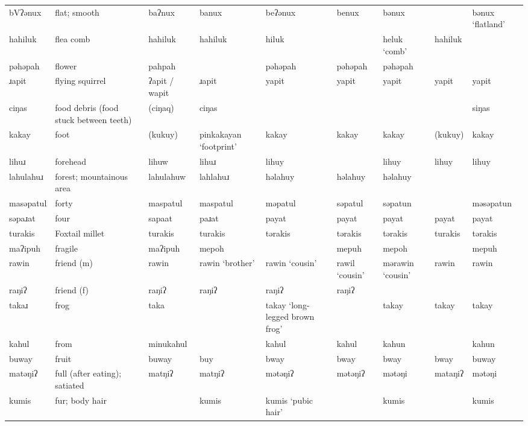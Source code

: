 \begin{landscape}
\begin{longtable}{*{9}{>{\raggedright\arraybackslash}p{}}}
\text{*}bVʔənux      & flat; smooth & baʔnux & banux & beʔənux & benux & bənux &  & bənux \newline `flatland'\\
\text{*}hahiluk      & flea comb & hahiluk & hahiluk & hiluk &  & heluk `comb' & hahiluk & \\
\text{*}pəhəpah      & flower & pahpah &  & pəhəpah & pəhəpah & pəhəpah &  & \\
\text{*}ɹapit        & flying squirrel & ʔapit / wapit & ɹapit & yapit & yapit & yapit & yapit & yapit\\
\text{*}ciŋas        & food debris (food stuck between teeth) & (ciŋaq) & ciŋas &  &  &  &  & siŋas\\
\text{*}kakay        & foot & (kukuy) & pinkakayan `footprint' & kakay & kakay & kakay & (kukuy) & kakay\\
\text{*}lihuɹ        & forehead & lihuw & lihuɹ & lihuy &  & lihuy & lihuy & lihuy\\
\text{*}lahulahuɹ    & forest; mountainous area & lahulahuw & lahlahuɹ & həlahuy & həlahuy & həlahuy &  & \\
\text{*}masəpatul    & forty & maspatul & maspatul & məpatul & səpatul & səpatun &  & məsəpatun\\
\text{*}səpaɹat      & four & sapaat & paɹat & payat & payat & payat & payat & payat\\
\text{*}turakis      & Foxtail millet & turakis & turakis & tərakis & tərakis & tərakis & turakis & tərakis\\
\text{*}maʔipuh      & fragile & maʔipuh & mepoh &  & mepuh & mepoh &  & mepuh\\
\text{*}rawin        & friend (m) & rawin & rawin `brother' & rawin `cousin' & rawil \newline `cousin' & mərawin `cousin' & rawin & rawin\\
\text{*}raŋiʔ        & friend (f) & raŋiʔ & raŋiʔ & raŋiʔ & raŋiʔ &  &  & \\
\text{*}takaɹ        & frog & taka &  & takay `long-legged brown frog' &  & takay & takay & takay\\
\text{*}kahul       & from & minukahul &  & kahul & kahul & kahun &  & kahun\\
\text{*}buway        & fruit & buway & buy & bway & bway & bway & bway & buway\\
\text{*}matəŋiʔ      & full (after eating); satiated & matŋiʔ & matŋiʔ & mətəŋiʔ & mətəŋiʔ & mətəŋi & mataŋiʔ & mətəŋi\\
\text{*}kumis        & fur; body hair &  & kumis & kumis \newline `pubic hair' &  & kumis &  & kumis\\

\end{longtable}
\end{landscape}
